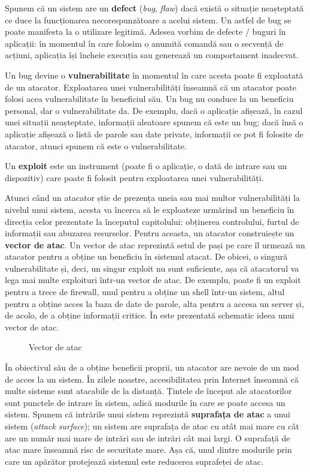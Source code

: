 Spunem că un sistem are un \textbf{defect} (\textit{bug}, \textit{flaw}) dacă există o situație neașteptată ce duce la funcționarea necorespunzătoare a acelui sistem.
Un astfel de bug se poate manifesta la o utilizare legitimă.
Adesea vorbim de defecte / buguri în aplicații: în momentul în care folosim o anumită comandă sau o secvență de acțiuni, aplicația își încheie execuția sau generează un comportament inadecvat.

Un bug devine o \textbf{vulnerabilitate} în momentul în care acesta poate fi exploatată de un atacator.
Exploatarea unei vulnerabilități înseamnă că un atacator poate folosi acea vulnerabilitate în beneficiul său.
Un bug nu conduce la un beneficiu personal, dar o vulnerabilitate da.
De exemplu, dacă o aplicație afișează, în cazul unei situații neașteptate, informații aleatoare spunem că este un bug;
dacă însă o aplicație afișează o listă de parole sau date private, informații ce pot fi folosite de atacator, atunci spunem că este o vulnerabilitate.

Un \textbf{exploit} este un instrument (poate fi o aplicație, o dată de intrare sau un dispozitiv) care poate fi folosit pentru exploatarea unei vulnerabilități.

Atunci când un atacator știe de prezența uneia sau mai multor vulnerabilități la nivelul unui sistem, acesta va încerca să le exploateze urmărind un beneficiu în direcția celor prezentate la începutul capitolului: obținerea controlului, furtul de informații sau abuzarea resurselor.
Pentru aceasta, un atacator construiește un \textbf{vector de atac}.
Un vector de atac reprezintă setul de pași pe care îl urmează un atacator pentru a obține un beneficiu în sistemul atacat.
De obicei, o singură vulnerabilitate și, deci, un singur exploit nu sunt suficiente, așa că atacatorul va lega mai multe exploituri într-un vector de atac.
De exemplu, poate fi un exploit pentru a trece de firewall, unul pentru a obține un shell într-un sistem, altul pentru a obține acces la baza de date de parole, alta pentru a accesa un server și, de acolo, de a obține informații critice.
În  este prezentată schematic ideea unui vector de atac.

\begin{figure}[htbp]
  \centering
  \def\svgwidth{\columnwidth}
  
  \caption{Vector de atac}
  \label{fig:sec:attack-vector}
\end{figure}

În obiectivul său de a obține beneficii proprii, un atacator are nevoie de un mod de acces la un sistem.
În zilele noastre, accesibilitatea prin Internet înseamnă că multe sisteme sunt atacabile de la distanță.
Țintele de început ale atacatorilor sunt punctele de intrare în sistem, adică modurile în care se poate accesa un sistem.
Spunem că intrările unui sistem reprezintă \textbf{suprafața de atac} a unui sistem (\textit{attack surface});
un sistem are suprafața de atac cu atât mai mare cu cât are un număr mai mare de intrări sau de intrări cât mai largi.
O suprafață de atac mare înseamnă risc de securitate mare.
Așa că, unul dintre modurile prin care un apărător protejează sistemul este reducerea suprafeței de atac.


